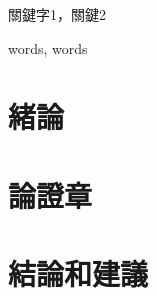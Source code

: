 \documentclass{format/MUSTThesisC}
\begin{document}
% 






\def\Ctitle 		{中文題目}
\def\Etitle 		{英文題目}
\def\Sname 			{Y.J.Li}
\def\Sno 			{1809853G-BM30-0053}
\def\Sfaculty 		{商學院}
\def\Sprogram 		{XXX}
\def\Smajor 		{123@qq.com} %
\def\Ssupervisor	{A/Prof.Jenny}
\def\Sdate			{\today}

\mustTitle
\deliberation
\announcement


\MUSTacknowledgement{
	
}

\mustCabstract
{
	
}
{關鍵字1，關鍵2}



\mustEabstract
{
	
}
{words, words}



\mustcontents
\mustFigureContents
\mustTableContents


\linespread{1.65}\selectfont


\chapter{緒論}

\chapter{論證章}

\chapter{結論和建議}





\bibreference
\end{document}
